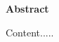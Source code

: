 \thispagestyle{plain}
\begin{flushleft}
    \Huge
    \textbf{Abstract}
\end{flushleft}
\vspace{1cm}
Content.....